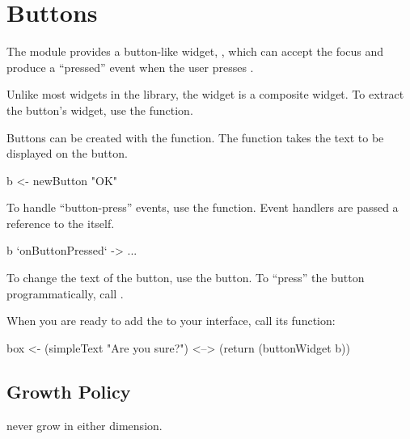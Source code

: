 \section{Buttons}

The  module provides a button-like widget, ,
which can accept the focus and produce a ``pressed'' event when the
user presses .

Unlike most widgets in the library, the  widget is a
composite widget.  To extract the button's widget, use the
 function.

Buttons can be created with the  function.  The function
takes the text to be displayed on the button.

\begin{haskellcode}
 b <- newButton "OK"
\end{haskellcode}

To handle ``button-press'' events, use the 
function.  Event handlers are passed a reference to the 
itself.

\begin{haskellcode}
 b `onButtonPressed` \this ->
   ...
\end{haskellcode}

To change the text of the button, use the  button.
To ``press'' the button programmatically, call .

When you are ready to add the  to your interface, call its
 function:

\begin{haskellcode}
 box <- (simpleText "Are you sure?") <--> (return (buttonWidget b))
\end{haskellcode}

\subsection{Growth Policy}

 never grow in either dimension.
